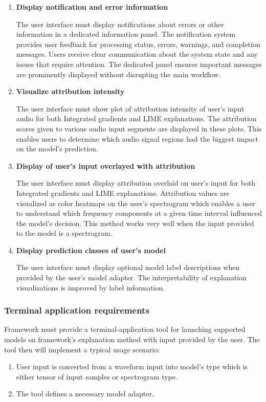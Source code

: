 \documentclass[
    bindingoffset=5mm,  %
    footnoteindent=3mm, %
    hyphenation=true    %
]{src/wut-thesis}
\begin{document}
\begin{enumerate}[itemsep=1\baselineskip]
    \item \textbf{Display notification and error information}

        The user interface must display notifications about errors or other information in a dedicated information
    panel. The notification system provides user feedback for processing status, errors, warnings,
    and completion messages. Users receive clear communication about the system state and any issues that
    require attention. The dedicated panel ensures important messages are prominently displayed without
    disrupting the main workflow.

    \item \textbf{Visualize attribution intensity}

        The user interface must show plot of attribution intensity of user's input audio
    for both Integrated gradients and LIME explanations. The attribution scores given to various audio input segments are displayed in these plots. This enables users to determine which audio signal regions had the biggest impact on the model's prediction.

    \item \textbf{Display of user's input overlayed with attribution}

        The user interface must display attribution overlaid on user's input for both Integrated gradients and LIME explanations.
    Attribution values are visualized as color heatmaps on the user's spectrogram which enables a user to
    understand which frequency components at a given time interval influenced the model's decision.
    This method works very well when the input provided to the model is a spectrogram.

    \item \textbf{Display prediction classes of user's model}

        The user interface must display optional model label descriptions when provided by the user's model adapter.
    The interpretability of explanation visualizations is improved by label information.

    \end{enumerate}

\subsubsection{Terminal application requirements}
    Framework must provide a terminal-application tool for launching supported models on framework's explanation method with input provided by the user. The tool then will implement a typical usage scenario:
    \begin{enumerate}
        \item User input is converted from a waveform input into model's type which is either tensor of input samples or spectrogram type.
        \item The tool defines a necessary model adapter,
    \end{enumerate}
\end{document}
